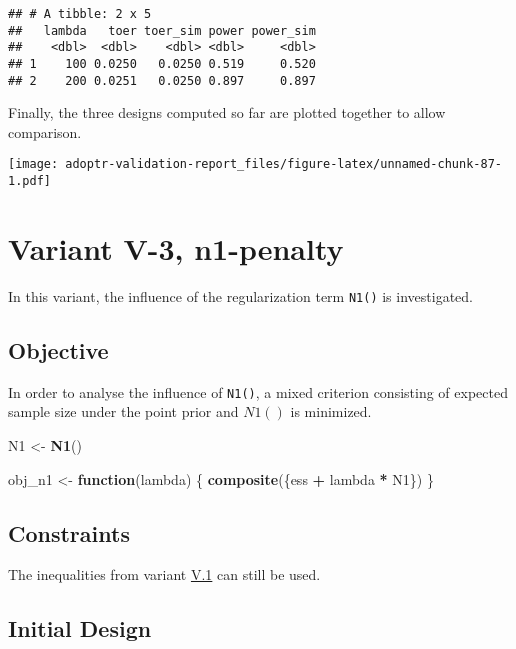 \documentclass[
]{book}
\newenvironment{Shaded}{\begin{snugshade}}{\end{snugshade}}
\newcommand{\ControlFlowTok}[1]{\textcolor[rgb]{0.13,0.29,0.53}{\textbf{#1}}}
\newcommand{\KeywordTok}[1]{\textcolor[rgb]{0.13,0.29,0.53}{\textbf{#1}}}
\newcommand{\NormalTok}[1]{#1}
\newcommand{\OperatorTok}[1]{\textcolor[rgb]{0.81,0.36,0.00}{\textbf{#1}}}
\newcommand{\StringTok}[1]{\textcolor[rgb]{0.31,0.60,0.02}{#1}}
\begin{document}
\begin{verbatim}
## # A tibble: 2 x 5
##   lambda   toer toer_sim power power_sim
##    <dbl>  <dbl>    <dbl> <dbl>     <dbl>
## 1    100 0.0250   0.0250 0.519     0.520
## 2    200 0.0251   0.0250 0.897     0.897
\end{verbatim}

Finally, the three designs computed so far are plotted together to allow
comparison.

\texttt{[image: adoptr-validation-report\_files/figure-latex/unnamed-chunk-87-1.pdf]}

\hypertarget{variantV_3}{%
\section{Variant V-3, n1-penalty}\label{variantV_3}}

In this variant, the influence of the regularization term \texttt{N1()} is investigated.

\hypertarget{objective-12}{%
\subsection{Objective}\label{objective-12}}

In order to analyse the influence of \texttt{N1()},
a mixed criterion consisting of expected sample size under the point prior
and \(N1()\) is minimized.

\begin{Shaded}
\begin{Highlighting}[]
\NormalTok{N1 <-}\StringTok{ }\KeywordTok{N1}\NormalTok{()}

\NormalTok{obj_n1 <-}\StringTok{ }\ControlFlowTok{function}\NormalTok{(lambda) \{}
  \KeywordTok{composite}\NormalTok{(\{ess }\OperatorTok{+}\StringTok{ }\NormalTok{lambda }\OperatorTok{*}\StringTok{ }\NormalTok{N1\})}
\NormalTok{\}}
\end{Highlighting}
\end{Shaded}

\hypertarget{constraints-12}{%
\subsection{Constraints}\label{constraints-12}}

The inequalities from variant \protect\hyperlink{variantV_1}{V.1} can still be used.

\hypertarget{initial-design-10}{%
\subsection{Initial Design}\label{initial-design-10}}
\end{document}
